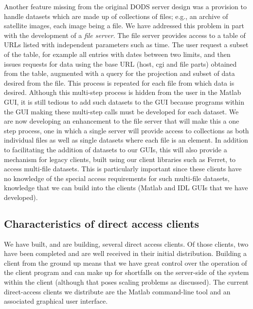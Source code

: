\documentclass[12pt]{article}
\begin{document}
Another feature missing from the original \ac{DODS} server design was a
provision to handle datasets which are made up of collections of files;
e.g., an archive of satellite images, each image being a file. We have
addressed this problem in part with the development of a \emph{file
server}. The file server provides access to a table of \acs{URL}s listed 
with independent parameters such as time. The user request a subset of 
the table, for example all entries with dates between two limits, and 
then issues requests for data using the base \acs{URL} (host, cgi and 
file parts) obtained from the table, augmented with a query for the 
projection and subset of data desired from the file. This process is 
repeated for each file from which data is desired. Although this 
multi-step process is hidden from the user in the Matlab \acs{GUI}, 
it is still tedious to add such datasets to the \acs{GUI} because 
programs within the \acs{GUI} making these multi-step calls must 
be developed for each dataset. We are now developing an enhancement 
to the file server that will make this a one step process, one in which 
a single server will provide access to collections as both individual files 
as well as single datasets where each file is an element. In addition to
facilitating the addition of datasets to our \acs{GUI}s, this will also
provide a mechanism for legacy clients, built using our client libraries
such as Ferret, to access multi-file datasets. This is particularly 
important since these clients have no knowledge of the special access 
requirements for such multi-file datasets, knowledge that we can build
into the clients (Matlab and IDL \acs{GUI}s that we have developed).

\subsection{Characteristics of direct access clients}
\label{dclients}

We have built, and are building, several direct access clients. Of those
clients, two have been completed and are well received in their initial
distribution. Building a client from the ground up means that we have great
control over the operation of the client program and can make up for 
shortfalls on the server-side of the system within the client (although that poses
scaling problems as discussed). The current direct-access clients we
distribute are the Matlab command-line tool and an associated
graphical user interface.
\end{document}
